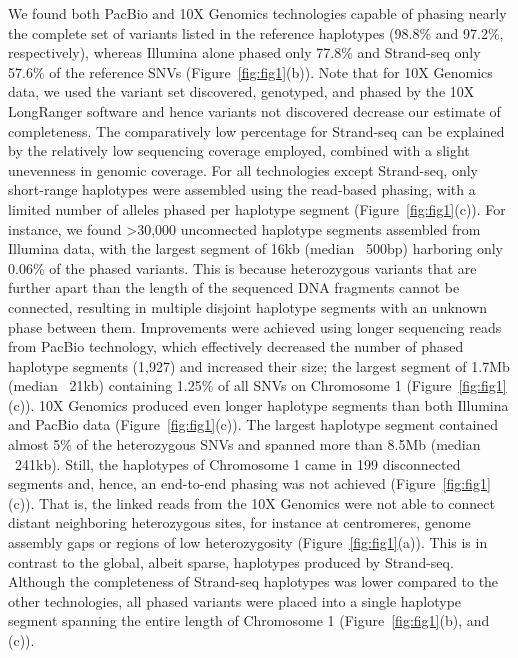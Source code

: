 	We found both PacBio and 10X Genomics technologies capable of phasing nearly the complete set of variants listed in the reference haplotypes (98.8\% and 97.2\%, respectively), 
	whereas Illumina alone phased only 77.8\% and Strand-seq only 57.6\% of the reference SNVs (Figure~\ref{fig:fig1}(b)). 
	Note that for 10X Genomics data, we used the variant set discovered, genotyped, and phased by the 10X LongRanger software and hence variants not discovered decrease our estimate of completeness.
	The comparatively low percentage for Strand-seq can be explained by the relatively low sequencing coverage employed, combined with a slight unevenness in genomic coverage. 
	For all technologies except Strand-seq, only short-range haplotypes were assembled using the read-based phasing, with a limited number of alleles phased per haplotype segment (Figure~\ref{fig:fig1}(c)). 
	For instance, we found >30,000 unconnected haplotype segments assembled from Illumina data, with the largest segment of 16kb (median ~500bp) harboring only 0.06\% of the phased variants. 
	This is because heterozygous variants that are further apart than the length of the sequenced DNA fragments cannot be connected, resulting in multiple disjoint haplotype segments with an unknown phase between them. 
	Improvements were achieved using longer sequencing reads from PacBio technology, which effectively decreased the number of phased haplotype segments (1,927) and increased their size; the largest segment of 1.7Mb (median ~21kb) 
	containing 1.25\% of all SNVs on Chromosome 1 (Figure~\ref{fig:fig1}(c)). 10X Genomics produced even longer haplotype segments than both Illumina and PacBio data (Figure~\ref{fig:fig1}(c)). 
	The largest haplotype segment contained almost 5\% of the heterozygous SNVs and spanned more than 8.5Mb (median ~241kb). Still, the haplotypes of Chromosome 1 came in 199 disconnected segments and, 
	hence, an end-to-end phasing was not achieved (Figure~\ref{fig:fig1}(c)). That is, the linked reads from the 10X Genomics were not able to connect distant neighboring heterozygous sites, for instance at centromeres, 
	genome assembly gaps or regions of low heterozygosity (Figure~\ref{fig:fig1}(a)). 
	This is in contrast to the global, albeit sparse, haplotypes produced by Strand-seq. 
	Although the completeness of Strand-seq haplotypes was lower compared to the other technologies, all phased variants were placed into a single haplotype segment spanning the entire length of Chromosome 1 (Figure~\ref{fig:fig1}(b), and (c)).	
	
